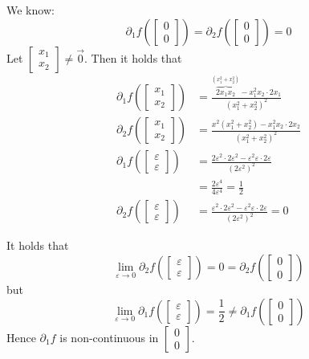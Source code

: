 \documentclass[a4paper,landscape,twocolumn]{article}
\theoremstyle{definition}
\begin{document}
We know:
\[ \partial_1 f(\begin{bmatrix} 0 \\ 0 \end{bmatrix}) = \partial_2 f(\begin{bmatrix} 0 \\ 0 \end{bmatrix}) = 0 \]
Let $\begin{bmatrix} x_1 \\ x_2 \end{bmatrix} \neq \vec{0}$. Then it holds that
\begin{align*}
  \partial_1 f(\begin{bmatrix} x_1 \\ x_2 \end{bmatrix}) &= \frac{\overbrace{2 x_1 x_2}^{(x_1^2 + x_2^2)} - x_1^2 x_2 \cdot 2x_1}{(x_1^2 + x_2^2)^2} \\
  \partial_2 f(\begin{bmatrix} x_1 \\ x_2 \end{bmatrix}) &= \frac{x^2 (x_1^2 + x_2^2) - x_1^2 x_2 \cdot 2x_2}{(x_1^2 + x_2^2)^2} \\
  \partial_1 f(\begin{bmatrix} \varepsilon \\ \varepsilon \end{bmatrix}) &= \frac{2\varepsilon^2 \cdot 2\varepsilon^2 - \varepsilon^2 \varepsilon \cdot 2 \varepsilon}{(2\varepsilon^2)^2} \\
    &= \frac{2\varepsilon^4}{4\varepsilon^4} = \frac12 \\
  \partial_2 f(\begin{bmatrix} \varepsilon \\ \varepsilon \end{bmatrix}) &= \frac{\varepsilon^2 \cdot 2 \varepsilon^2 - \varepsilon^2 \varepsilon \cdot 2 \varepsilon}{(2\varepsilon^2)^2} = 0
\end{align*}

It holds that
\[ \lim_{\varepsilon\to0} \partial_2 f(\begin{bmatrix} \varepsilon \\ \varepsilon \end{bmatrix}) = 0 = \partial_2 f(\begin{bmatrix} 0 \\ 0 \end{bmatrix}) \]
but
\[ \lim_{\varepsilon\to0} \partial_1 f(\begin{bmatrix} \varepsilon \\ \varepsilon \end{bmatrix}) = \frac12 \neq \partial_1 f(\begin{bmatrix} 0 \\ 0 \end{bmatrix}) \]
Hence $\partial_1 f$ is non-continuous in $\begin{bmatrix} 0 \\ 0 \end{bmatrix}$.
\end{document}
